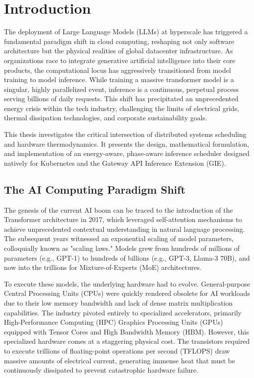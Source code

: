 \documentclass[12pt,a4paper,oneside]{report}
\begin{document}
\tableofcontents
\listoffigures
\listoftables

\clearpage
{}

\chapter{Introduction}
\label{ch:introduction}

The deployment of Large Language Models (LLMs) at hyperscale has triggered a fundamental paradigm shift in cloud computing, reshaping not only software architecture but the physical realities of global datacenter infrastructure. As organizations race to integrate generative artificial intelligence into their core products, the computational locus has aggressively transitioned from model training to model inference. While training a massive transformer model is a singular, highly parallelized event, inference is a continuous, perpetual process serving billions of daily requests. This shift has precipitated an unprecedented energy crisis within the tech industry, challenging the limits of electrical grids, thermal dissipation technologies, and corporate sustainability goals. 

This thesis investigates the critical intersection of distributed systems scheduling and hardware thermodynamics. It presents the design, mathematical formulation, and implementation of an energy-aware, phase-aware inference scheduler designed natively for Kubernetes and the Gateway API Inference Extension (GIE). 

\section{The AI Computing Paradigm Shift}
\label{sec:intro_paradigm}

The genesis of the current AI boom can be traced to the introduction of the Transformer architecture in 2017, which leveraged self-attention mechanisms to achieve unprecedented contextual understanding in natural language processing. The subsequent years witnessed an exponential scaling of model parameters, colloquially known as "scaling laws." Models grew from hundreds of millions of parameters (e.g., GPT-1) to hundreds of billions (e.g., GPT-3, Llama-3 70B), and now into the trillions for Mixture-of-Experts (MoE) architectures. 

To execute these models, the underlying hardware had to evolve. General-purpose Central Processing Units (CPUs) were quickly rendered obsolete for AI workloads due to their low memory bandwidth and lack of dense matrix multiplication capabilities. The industry pivoted entirely to specialized accelerators, primarily High-Performance Computing (HPC) Graphics Processing Units (GPUs) equipped with Tensor Cores and High Bandwidth Memory (HBM). However, this specialized hardware comes at a staggering physical cost. The transistors required to execute trillions of floating-point operations per second (TFLOPS) draw massive amounts of electrical current, generating immense heat that must be continuously dissipated to prevent catastrophic hardware failure.
\end{document}
